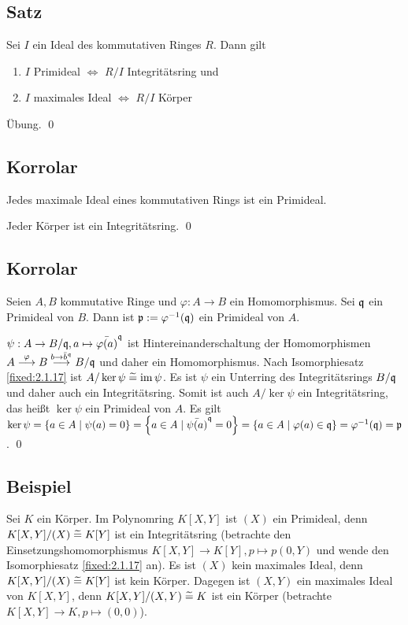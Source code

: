 \subsection{Satz} Sei $I$ ein Ideal des kommutativen Ringes $R$. Dann gilt
\begin{enumerate}[label=(\alph*)]
	\item
		$I$ Primideal $\iff$ $R/I$ Integritätsring \quad und
	\item
		$I$ maximales Ideal $\iff$ $R/I$ Körper
\end{enumerate}

\proof Übung. \qed

\subsection{Korrolar} Jedes maximale Ideal eines kommutativen Rings ist ein Primideal.

\proof Jeder Körper ist ein Integritätsring. \qed

\subsection{Korrolar} Seien $A, B$ kommutative Ringe und $\varphi: A \to B$ ein Homomorphismus. Sei $\mathfrak q$ ein Primideal von $B$. Dann ist $\mathfrak p := \varphi^{-1}(\mathfrak q)$ ein Primideal von $A$.

\proof $\psi: A \to B/\mathfrak q, a \mapsto \bar{\varphi(a)}^\mathfrak q$ ist Hintereinanderschaltung der Homomorphismen $A \stackrel{\varphi}{\longrightarrow} B \stackrel{b \to \bar b^\mathfrak q}{\longrightarrow} B/\mathfrak q$ und daher ein Homomorphismus. Nach Isomorphiesatz \ref{fixed:2.1.17} ist $A/\ker\psi \mathrel{\widetilde{=}} \operatorname{im} \psi$. Es ist $\psi$ ein Unterring des Integritätsrings $B/\mathfrak q$ und daher auch ein Integritätsring. Somit ist auch $A/\ker\psi$ ein Integritätsring, das heißt $\ker\psi$ ein Primideal von $A$. Es gilt $\ker\psi = \{a \in A \mid \psi(a) = 0\} = \left\{a \in A \mid \bar{\psi(a)}^\mathfrak q = 0\right\} = \{a \in A \mid \varphi(a) \in \mathfrak q\} = \varphi^{-1}(\mathfrak q) = \mathfrak p$. \qed

\subsection{Beispiel} Sei $K$ ein Körper. Im Polynomring $K[X,Y]$ ist $(X)$ ein Primideal, denn $K[X,Y]/(X) \mathrel{\widetilde{=}} K[Y]$ ist ein Integritätsring (betrachte den Einsetzungshomomorphismus $K[X,Y] \to K[Y], p \mapsto p(0,Y)$ und wende den Isomorphiesatz \ref{fixed:2.1.17} an). Es ist $(X)$ kein maximales Ideal, denn $K[X,Y]/(X) \mathrel{\widetilde{=}} K[Y]$ ist kein Körper. Dagegen ist $(X,Y)$ ein maximales Ideal von $K[X,Y]$, denn $K[X,Y]/(X,Y) \mathrel{\widetilde{=}} K$ ist ein Körper (betrachte $K[X,Y] \to K, p \mapsto (0,0)$).


